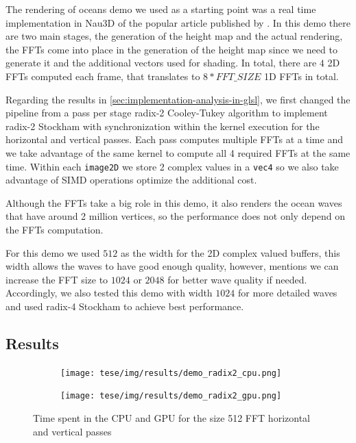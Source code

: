 \documentclass[
  oneside,
  11pt, a4paper,
  footinclude=true,
  headinclude=true,
  cleardoublepage=empty
]{scrbook}
\begin{document}
The rendering of oceans demo we used as a starting point was a real time implementation in Nau3D of the popular article published by \cite{tessendorf2001simulating}. In this demo there are two main stages, the generation of the height map and the actual rendering, the FFTs come into place in the generation of the height map since we need to generate it and the additional vectors used for shading. In total, there are $4$ 2D FFTs computed each frame, that translates to $8*FFT\_SIZE$ 1D FFTs in total.
\newline 

Regarding the results in \autoref{sec:implementation-analysis-in-glsl}, we first changed the pipeline from a pass per stage radix-2 Cooley-Tukey algorithm to implement radix-2 Stockham with synchronization within the kernel execution for the horizontal and vertical passes. Each pass computes multiple FFTs at a time and we take advantage of the same kernel to compute all 4 required FFTs at the same time.  Within each \texttt{image2D} we store 2 complex values in a \texttt{vec4} so we also take advantage of SIMD operations optimize the additional cost. 

Although the FFTs take a big role in this demo, it also renders the ocean waves that have around 2 million vertices, so the performance does not only depend on the FFTs computation.
\newline

For this demo we used $512$ as the width for the 2D complex valued buffers, this width allows the waves to have good enough quality, however, \cite{tessendorf2001simulating} mentions we can increase the FFT size to $1024$ or $2048$ for better wave quality if needed. Accordingly, we also tested this demo with width $1024$ for more detailed waves and used radix-4 Stockham to achieve best performance.


\subsection{Results} \label{subsec:results}

\begin{figure}[H] 
    \begin{subfigure}{.5\textwidth}
        \centering
        \texttt{[image: tese/img/results/demo\_radix2\_cpu.png]}
    \end{subfigure}
    \begin{subfigure}{.5\textwidth}
        \centering
        \texttt{[image: tese/img/results/demo\_radix2\_gpu.png]}
    \end{subfigure}
    \caption{Time spent in the CPU and GPU for the size 512 FFT horizontal and vertical passes}
    \label{fig:demo-radix2}
\end{figure}
\end{document}
